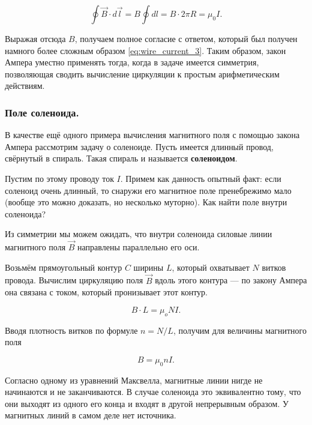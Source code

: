 \documentclass[a4paper,12pt]{article}
\begin{document}
\begin{equation}
  \label{eq:wire_current_ampere}
  \oint \vec{B} \cdot d\vec{l} = B \oint dl = B\cdot 2\pi R = \mu_0 I.
\end{equation}

Выражая отсюда $B$, получаем полное согласие с ответом, который был
получен намного более сложным образом \eqref{eq:wire_current_3}. Таким
образом, закон Ампера уместно применять тогда, когда в задаче имеется
симметрия, позволяющая сводить вычисление циркуляции к простым
арифметическим действиям. 

\subsubsection{Поле соленоида. }
\label{sec:solenoid}

В качестве ещё одного примера вычисления магнитного поля с помощью
закона Ампера рассмотрим задачу о соленоиде. Пусть имеется длинный
провод, свёрнутый в спираль. Такая спираль и называется
\textbf{соленоидом}. 

Пустим по этому проводу ток $I$. Примем как данность опытный факт:
если соленоид очень длинный, то снаружи его магнитное поле
пренебрежимо мало (вообще это можно доказать, но несколько
муторно). Как найти поле внутри соленоида? 

Из симметрии мы можем ожидать, что внутри соленоида силовые линии
магнитного поля $\vec{B}$ направлены параллельно его оси. 

Возьмём прямоугольный контур $C$ ширины $L$, который охватывает $N$
витков провода. Вычислим циркуляцию поля $\vec{B}$ вдоль этого
контура --- по закону Ампера она связана с током, который пронизывает
этот контур. 

\begin{equation}
  \label{eq:der_mfield_solenoid}
  B \cdot L = \mu_o N I.
\end{equation}

Вводя плотность витков по формуле $n = N/L$, получим для величины
магнитного поля

\begin{equation}
  \label{eq:mfield_solenoid}
  B = \mu_0 n I.
\end{equation}

Согласно одному из уравнений Максвелла, магнитные линии нигде не
начинаются и не заканчиваются. В случае соленоида это эквивалентно
тому, что они выходят из одного его конца и входят в другой
непрерывным образом. У магнитных линий в самом деле нет источника. 
\end{document}
